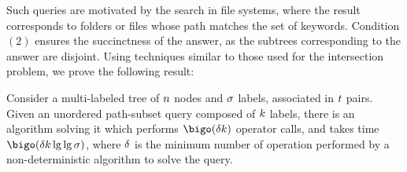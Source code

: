Such queries are motivated by the search in file systems, where the
result corresponds to folders or files whose path matches the set of
keywords.
%
Condition $(2)$ ensures the succinctness of the answer, as the
subtrees corresponding to the answer are disjoint.
%
Using techniques similar to those used for the intersection problem,
we prove the following result:

\begin{theorem}\label{th:mTreeExactMatchUB}
  Consider a multi-labeled tree of $n$ nodes and $\sigma$
  labels, associated in $t$ pairs.
%
  Given an unordered path-subset query composed of $k$
  labels, there is an algorithm solving it which performs
  $\mTreeExactSearches$ operator calls, and takes time
  $\mTreeExactTime$, where $\delta$ is the minimum number of
  operation performed by a non-deterministic algorithm to solve the
  query.
\end{theorem}


